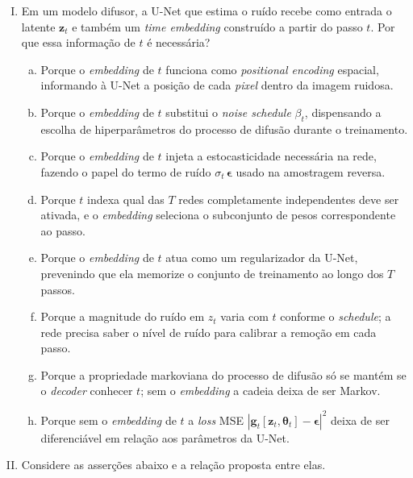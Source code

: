 \documentclass{dlproblemset}
\newcommand{\thetav}{\boldsymbol{\theta}}
\begin{document}
\begin{enumerate}[I)]
\item Em um modelo difusor, a U-Net que estima o ruído recebe como entrada o latente $\mathbf{z}_t$ e também um \textit{time embedding} construído a partir do passo $t$. Por que essa informação de $t$ é necessária?
\begin{enumerate}[(a)]
    \item Porque o \textit{embedding} de $t$ funciona como \textit{positional encoding} espacial, informando à U-Net a posição de cada \textit{pixel} dentro da imagem ruidosa.
    \item Porque o \textit{embedding} de $t$ substitui o \textit{noise schedule} $\beta_t$, dispensando a escolha de hiperparâmetros do processo de difusão durante o treinamento.
    \item Porque o \textit{embedding} de $t$ injeta a estocasticidade necessária na rede, fazendo o papel do termo de ruído $\sigma_t\,\boldsymbol{\epsilon}$ usado na amostragem reversa.
    \item Porque $t$ indexa qual das $T$ redes completamente independentes deve ser ativada, e o \textit{embedding} seleciona o subconjunto de pesos correspondente ao passo.
    \item Porque o \textit{embedding} de $t$ atua como um regularizador da U-Net, prevenindo que ela memorize o conjunto de treinamento ao longo dos $T$ passos.
    \item Porque a magnitude do ruído em $z_t$ varia com $t$ conforme o \textit{schedule}; a rede precisa saber o nível de ruído para calibrar a remoção em cada passo.
    \item Porque a propriedade markoviana do processo de difusão só se mantém se o \textit{decoder} conhecer $t$; sem o \textit{embedding} a cadeia deixa de ser Markov.
    \item Porque sem o \textit{embedding} de $t$ a \emph{loss} MSE $|\mathbf{g}_t[\mathbf{z}_t,\thetav_t] - \boldsymbol{\epsilon}|^{2}$ deixa de ser diferenciável em relação aos parâmetros da U-Net.
\end{enumerate}

\item Considere as asserções abaixo e a relação proposta entre elas.


\end{enumerate}
\end{document}
